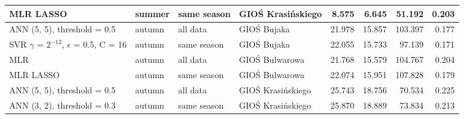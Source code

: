 \begin{landscape}
\begin{table}[ht]
\begin{tabular}{llllrrrr}
MLR LASSO & summer & same season & GIOŚ Krasińskiego & 8.575 & 6.645 & 51.192 & 0.203 \\
\midrule
ANN (5, 5), threshold = 0.5 & autumn & all data & GIOŚ Bujaka & 21.978 & 15.857 & 103.397 & 0.177 \\
SVR $\gamma$ = $2^{-12}$, $\epsilon$ = 0.5, C = 16 & autumn & same season & GIOŚ Bujaka & 22.055 & 15.733 & 97.139 & 0.171 \\
MLR & autumn & all data & GIOŚ Bulwarowa & 21.768 & 15.579 & 104.767 & 0.204 \\
MLR LASSO & autumn & same season & GIOŚ Bulwarowa & 22.074 & 15.951 & 107.828 & 0.179 \\
ANN (5, 5), threshold = 0.5 & autumn & all data & GIOŚ Krasińskiego & 25.743 & 18.756 & 70.534 & 0.225 \\
ANN (3, 2), threshold = 0.3 & autumn & same season & GIOŚ Krasińskiego & 25.870 & 18.889 & 73.834 & 0.213 \\ \bottomrule
\end{tabular}
\end{table}
\end{landscape}


